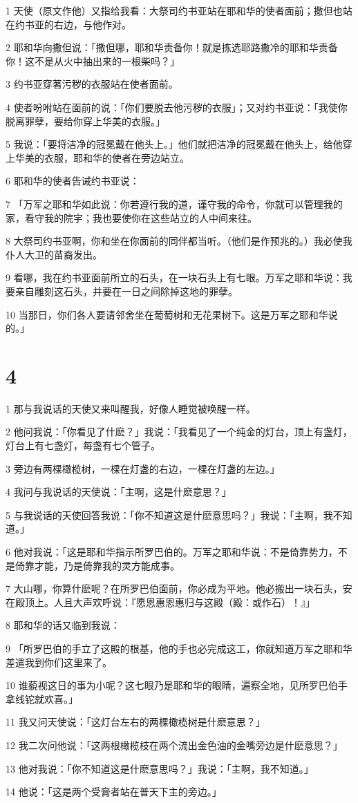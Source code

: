\par 1 天使（原文作他）又指给我看：大祭司约书亚站在耶和华的使者面前；撒但也站在约书亚的右边，与他作对。
\par 2 耶和华向撒但说：「撒但哪，耶和华责备你！就是拣选耶路撒冷的耶和华责备你！这不是从火中抽出来的一根柴吗？」
\par 3 约书亚穿著污秽的衣服站在使者面前。
\par 4 使者吩咐站在面前的说：「你们要脱去他污秽的衣服」；又对约书亚说：「我使你脱离罪孽，要给你穿上华美的衣服。」
\par 5 我说：「要将洁净的冠冕戴在他头上。」他们就把洁净的冠冕戴在他头上，给他穿上华美的衣服，耶和华的使者在旁边站立。
\par 6 耶和华的使者告诫约书亚说：
\par 7 「万军之耶和华如此说：你若遵行我的道，谨守我的命令，你就可以管理我的家，看守我的院宇；我也要使你在这些站立的人中间来往。
\par 8 大祭司约书亚啊，你和坐在你面前的同伴都当听。（他们是作预兆的。）我必使我仆人大卫的苗裔发出。
\par 9 看哪，我在约书亚面前所立的石头，在一块石头上有七眼。万军之耶和华说：我要亲自雕刻这石头，并要在一日之间除掉这地的罪孽。
\par 10 当那日，你们各人要请邻舍坐在葡萄树和无花果树下。这是万军之耶和华说的。」

\chapter{4}

\par 1 那与我说话的天使又来叫醒我，好像人睡觉被唤醒一样。
\par 2 他问我说：「你看见了什麽？」我说：「我看见了一个纯金的灯台，顶上有盏灯，灯台上有七盏灯，每盏有七个管子。
\par 3 旁边有两棵橄榄树，一棵在灯盏的右边，一棵在灯盏的左边。」
\par 4 我问与我说话的天使说：「主啊，这是什麽意思？」
\par 5 与我说话的天使回答我说：「你不知道这是什麽意思吗？」我说：「主啊，我不知道。」
\par 6 他对我说：「这是耶和华指示所罗巴伯的。万军之耶和华说：不是倚靠势力，不是倚靠才能，乃是倚靠我的灵方能成事。
\par 7 大山哪，你算什麽呢？在所罗巴伯面前，你必成为平地。他必搬出一块石头，安在殿顶上。人且大声欢呼说：『愿恩惠恩惠归与这殿（殿：或作石）！』」
\par 8 耶和华的话又临到我说：
\par 9 「所罗巴伯的手立了这殿的根基，他的手也必完成这工，你就知道万军之耶和华差遣我到你们这里来了。
\par 10 谁藐视这日的事为小呢？这七眼乃是耶和华的眼睛，遍察全地，见所罗巴伯手拿线铊就欢喜。」
\par 11 我又问天使说：「这灯台左右的两棵橄榄树是什麽意思？」
\par 12 我二次问他说：「这两根橄榄枝在两个流出金色油的金嘴旁边是什麽意思？」
\par 13 他对我说：「你不知道这是什麽意思吗？」我说：「主啊，我不知道。」
\par 14 他说：「这是两个受膏者站在普天下主的旁边。」

